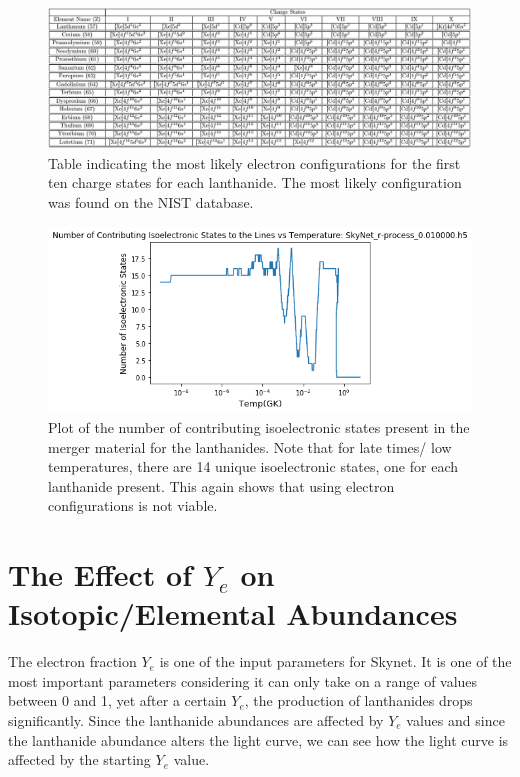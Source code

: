 \documentclass[11pt,a4paper]{article}
\begin{document}
\begin{figure}[h!]
  \includegraphics[scale = .65]{configurations.png}
  \caption{Table indicating the most likely electron configurations for the first ten charge states for each lanthanide. The most likely configuration was found on the NIST database.}
\end{figure}

\begin{figure}[h!]
  \includegraphics[scale = .6]{isoelectronic.png}
  \centering
  \caption{Plot of the number of contributing isoelectronic states present in the merger material for the lanthanides. Note that for late times/ low temperatures, there are 14 unique isoelectronic states, one for each lanthanide present. This again shows that using electron configurations is not viable. }
\end{figure}


\section{The Effect of $Y_e$ on Isotopic/Elemental Abundances}  

The electron fraction $Y_e$ is one of the input parameters for Skynet. It is one of the most important parameters considering it can only take on a range of values between 0 and 1, yet after a certain $Y_e$, the production of lanthanides drops significantly. Since the lanthanide abundances are affected by $Y_e$ values and since the lanthanide abundance alters the light curve, we can see how the light curve is affected by the starting $Y_e$ value.
\end{document}
